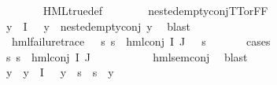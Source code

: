 \begin{isabellebody}
\ \ \ \ \ \ \isamarkupfalse%
\ HML{\isacharunderscore}{\kern0pt}true{\isacharunderscore}{\kern0pt}def\isanewline
\ \ \ \ \ \ \isamarkupfalse%
\ nested{\isacharunderscore}{\kern0pt}empty{\isacharunderscore}{\kern0pt}conj{\isacharunderscore}{\kern0pt}TT{\isacharunderscore}{\kern0pt}or{\isacharunderscore}{\kern0pt}FF\isanewline
\ \ \ \ \ \ \isamarkupfalse%
\ {\isacartoucheopen}{\isasymforall}y{\isasymin}{\isasymPhi}\ {\isacharbackquote}{\kern0pt}\ I{\isachardot}{\kern0pt}\ {\isasymphi}\ {\isasymnoteq}\ y\ {\isasymlongrightarrow}\ nested{\isacharunderscore}{\kern0pt}empty{\isacharunderscore}{\kern0pt}conj\ y{\isacartoucheclose}\ \isamarkupfalse%
\ blast\isanewline
\ \ \ \ \isamarkupfalse%
\ \isamarkupfalse%
\ {\isachardoublequoteopen}{\isasymexists}{\isasympsi}{\isachardot}{\kern0pt}\ hml{\isacharunderscore}{\kern0pt}failure{\isacharunderscore}{\kern0pt}trace\ {\isasympsi}\ {\isasymand}\ {\isacharparenleft}{\kern0pt}{\isasymforall}s{\isachardot}{\kern0pt}\ {\isacharparenleft}{\kern0pt}s\ {\isasymTurnstile}\ hml{\isacharunderscore}{\kern0pt}conj\ I\ J\ {\isasymPhi}{\isacharparenright}{\kern0pt}\ {\isacharequal}{\kern0pt}\ {\isacharparenleft}{\kern0pt}s\ {\isasymTurnstile}\ {\isasympsi}{\isacharparenright}{\kern0pt}{\isacharparenright}{\kern0pt}{\isachardoublequoteclose}\isanewline
\ \ \ \ \isamarkupfalse%
{\isacharparenleft}{\kern0pt}cases{\isacharparenright}{\kern0pt}\isanewline
\ \ \ \ \ \ \isamarkupfalse%
\ {}\isanewline
\ \ \ \ \ \ \isamarkupfalse%
\ {\isachardoublequoteopen}{\isasymforall}s{\isachardot}{\kern0pt}\ {\isasymnot}s\ {\isasymTurnstile}\ {\isacharparenleft}{\kern0pt}hml{\isacharunderscore}{\kern0pt}conj\ I\ J\ {\isasymPhi}{\isacharparenright}{\kern0pt}{\isachardoublequoteclose}\isanewline
\ \ \ \ \ \ \ \ \isamarkupfalse%
\ hml{\isacharunderscore}{\kern0pt}sem{\isacharunderscore}{\kern0pt}conj\ \isamarkupfalse%
\ blast\isanewline
\ \ \ \ \ \ \isamarkupfalse%
\ y\ \ {\isachardoublequoteopen}y\ {\isasymin}\ {\isasymPhi}{\isacharbackquote}{\kern0pt}I{\isachardoublequoteclose}\ {\isachardoublequoteopen}{\isasymphi}\ {\isasymnoteq}\ y\ {\isasymand}\ {\isacharparenleft}{\kern0pt}{\isasymforall}s{\isachardot}{\kern0pt}\ {\isasymnot}\ s\ {\isasymTurnstile}\ y{\isacharparenright}{\kern0pt}{\isachardoublequoteclose}\ \isanewline
\ \ \ \ \ \ \ \ \isamarkupfalse%
\ {\isachardoublequoteopen}{}{\isachardoublequoteclose}\ \isamarkupfalse%

\end{isabellebody}
